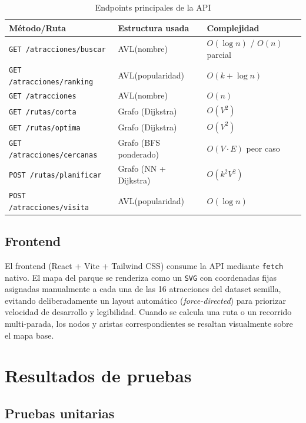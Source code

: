 \documentclass[conference]{IEEEtran}
\begin{document}
\begin{table}[htbp]
\caption{Endpoints principales de la API}
\label{tab:endpoints}
\centering
\begin{tabular}{@{}p{}p{}p{}@{}}
\toprule
\textbf{M\'etodo/Ruta} & \textbf{Estructura usada} & \textbf{Complejidad} \\
\midrule
\texttt{GET /atracciones/buscar} & AVL(nombre) & $O(\log n)$ / $O(n)$ parcial \\
\texttt{GET /atracciones/ranking} & AVL(popularidad) & $O(k + \log n)$ \\
\texttt{GET /atracciones} & AVL(nombre) & $O(n)$ \\
\texttt{GET /rutas/corta} & Grafo (Dijkstra) & $O(V^2)$ \\
\texttt{GET /rutas/optima} & Grafo (Dijkstra) & $O(V^2)$ \\
\texttt{GET /atracciones/cercanas} & Grafo (BFS ponderado) & $O(V \cdot E)$ peor caso \\
\texttt{POST /rutas/planificar} & Grafo (NN + Dijkstra) & $O(k^2 V^2)$ \\
\texttt{POST /atracciones/visita} & AVL(popularidad) & $O(\log n)$ \\
\bottomrule
\end{tabular}
\end{table}

\subsection{Frontend}

El frontend (React + Vite + Tailwind CSS) consume la API mediante
\texttt{fetch} nativo. El mapa del parque se renderiza como un \texttt{SVG}
con coordenadas fijas asignadas manualmente a cada una de las 16 atracciones
del dataset semilla, evitando deliberadamente un layout autom\'atico
(\emph{force-directed}) para priorizar velocidad de desarrollo y legibilidad.
Cuando se calcula una ruta o un recorrido multi-parada, los nodos y aristas
correspondientes se resaltan visualmente sobre el mapa base.

\section{Resultados de pruebas}

\subsection{Pruebas unitarias}
\end{document}
